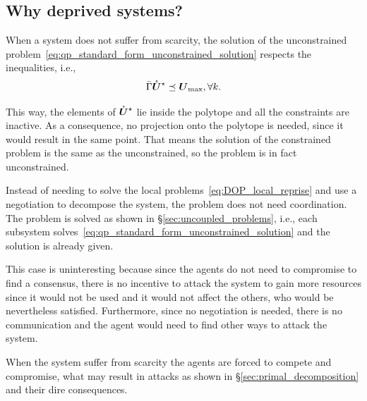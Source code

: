 \documentclass[../main.tex]{subfiles}
\begin{document}
\subsection{Why deprived systems?}\label{sec:why-deprived-systems}

When a system does not suffer from scarcity, the solution of the unconstrained problem~\eqref{eq:qp_standard_form_unconstrained_solution} respects the inequalities, i.e.,
\begin{equation}
\bar{\Gamma}{\mathring{\boldsymbol{U}}^{\star}}\preceq {\boldsymbol{U}}_{\text{max}},\forall k.
\end{equation}

This way, the elements of ${\mathring{\boldsymbol{U}}^{\star}}$ lie inside the polytope and all the constraints are inactive.
As a consequence, no projection onto the polytope is needed, since it would result in the same point.
That means the solution of the constrained problem is the same as the unconstrained, so the problem is in fact unconstrained.

Instead of needing to solve the local problems~\eqref{eq:DOP_local_reprise} and use a negotiation to decompose the system, the problem does not need coordination.
The problem is solved as shown in \S\ref{sec:uncoupled_problems}, i.e., each subsystem solves~\eqref{eq:qp_standard_form_unconstrained_solution} and the solution is already given.

This case is uninteresting because since the agents do not need to compromise to find a consensus, there is no incentive to attack the system to gain more resources since it would not be used and it would not affect the others, who would be nevertheless satisfied.
Furthermore, since no negotiation is needed, there is no communication and the agent would need to find other ways to attack the system.

When the system suffer from scarcity the agents are forced to compete and compromise, what may result in attacks as shown in \S\ref{sec:primal_decomposition} and their dire consequences.
\end{document}
